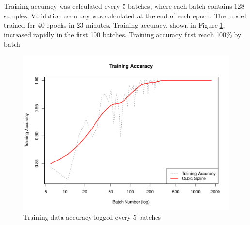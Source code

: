 Training accuracy was calculated every 5 batches, where each batch contains 128 samples. Validation accuracy was calculated at the end of each epoch. The model trained for 40 epochs in 23 minutes. Training accuracy, shown in Figure \ref{results-train-acc-fig}, increased rapidly in the first 100 batches. Training accuracy first reach 100\% by batch 
\begin{figure}[ht]
	\centering
	\includegraphics[width=\textwidth]{Images/7_train_acc4.pdf}
	\caption{Training data accuracy logged every 5 batches}
	\label{results-train-acc-fig}
\end{figure}

